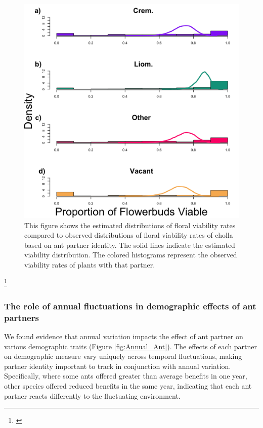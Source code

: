 \documentclass[11pt]{article}
\newcommand{\ali}[2]{{\color{blue}{#1}}\footnote{\textit{\color{blue}{#2}}}}
\begin{document}
\begin{figure}[H]
	\includegraphics[width=0.95\linewidth]{Figures/ViabHist.png}
	\caption{This figure shows the estimated distributions of floral viability rates compared to observed distributions of floral viability rates of cholla based on ant partner identity. The solid lines indicate the estimated viability distribution. The colored histograms represent the observed viability rates of plants with that partner. }
	\label{fig:Viab}
\end{figure}

\ali{}{Should I include other model results here or just indicate that the rest are reported in an appendix/supplementary materials?}

\subsubsection*{The role of annual fluctuations in demographic effects of ant partners}
We found evidence that annual variation impacts the effect of ant partner on various demographic traits (Figure \ref{fig:Annual_Ant}).
The effects of each partner on demographic measure vary uniquely across temporal fluctuations, making partner identity important to track in conjunction with annual variation. 
Specifically, where some ants offered greater than average benefits in one year, other species offered reduced benefits in the same year, indicating that each ant partner reacts differently to the fluctuating environment. 
\end{document}
